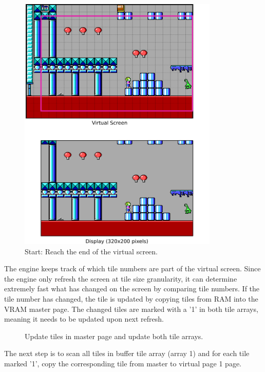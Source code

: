 \documentclass[book.tex]{subfiles}
\begin{document}
 
\begin{figure}[H]
\centering
 \includegraphics[width=0.85\textwidth]{screenshots_300dpi/game/Keen_ATR_1-3_a.png}
 \caption{Start: Reach the end of the virtual screen.}
 \label{fig:kc1_3_start}
\end{figure}

\pagebreak
The engine keeps track of which tile numbers are part of the virtual screen. Since the engine only refresh the screen at tile size granularity, it can determine extremely fast what has changed on the screen by comparing tile numbers. If the tile number has changed, the tile is updated by copying tiles from RAM into the VRAM master page. The changed tiles are marked with a '1' in both tile arrays, meaning it needs to be updated upon next refresh.

\begin{figure}[H]
\centering
 \caption{Update tiles in master page and update both tile arrays.}
 \label{fig:kc1_3_step1}
\end{figure}

\pagebreak
The next step is to scan all tiles in buffer tile array (array 1) and for each tile marked '1', copy the corresponding tile from master to virtual page 1 page.\\
\end{document}
